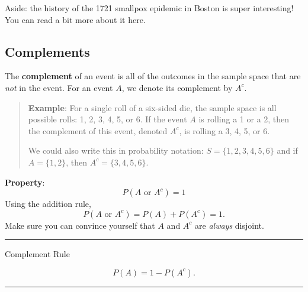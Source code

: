 \documentclass[
]{book}
\begin{document}
Aside: the history of the 1721 smallpox epidemic in Boston is super interesting! You can read a bit more about it here.

\subsection{Complements}\label{complements}

The \textbf{complement} of an event is all of the outcomes in the sample space that are \emph{not} in the event. For an event \(A\), we denote its complement by \(A^c\).

\begin{quote}
\textbf{Example}: For a single roll of a six-sided die, the sample space is all possible rolls: 1, 2, 3, 4, 5, or 6. If the event \(A\) is rolling a 1 or a 2, then the complement of this event, denoted \(A^c\), is rolling a 3, 4, 5, or 6.

We could also write this in probability notation: \(S = \{1, 2, 3, 4, 5, 6\}\) and if \(A=\{1,2\}\), then \(A^c=\{3, 4, 5, 6\}\).
\end{quote}

\textbf{Property}: \[P(A \text{ or } A^c)=1\] Using the addition rule, \[P(A \text{ or } A^c) = P(A)+P(A^c) = 1.\] Make sure you can convince yourself that \(A\) and \(A^c\) are \emph{always} disjoint.

\begin{center}\rule{0.5\linewidth}{0.5pt}\end{center}

Complement Rule

\[P(A) = 1-P(A^c).\]

\begin{center}\rule{0.5\linewidth}{0.5pt}\end{center}
\end{document}

